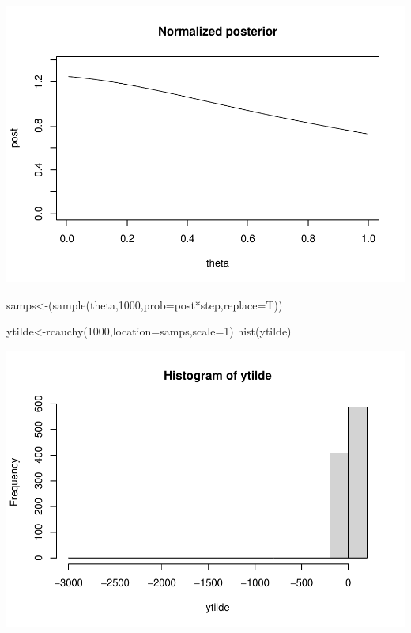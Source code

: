 \documentclass[
]{book}
\newenvironment{Shaded}{\begin{snugshade}}{\end{snugshade}}
\newcommand{\AttributeTok}[1]{\textcolor[rgb]{0.77,0.63,0.00}{#1}}
\newcommand{\DecValTok}[1]{\textcolor[rgb]{0.00,0.00,0.81}{#1}}
\newcommand{\FunctionTok}[1]{\textcolor[rgb]{0.00,0.00,0.00}{#1}}
\newcommand{\NormalTok}[1]{#1}
\newcommand{\OtherTok}[1]{\textcolor[rgb]{0.56,0.35,0.01}{#1}}
\newcommand{\SpecialCharTok}[1]{\textcolor[rgb]{0.00,0.00,0.00}{#1}}
\theoremstyle{definition}
\theoremstyle{definition}
\theoremstyle{definition}
\theoremstyle{definition}
\theoremstyle{remark}
\begin{document}
\includegraphics{_main_files/figure-latex/unnamed-chunk-53-1.pdf}

\begin{Shaded}
\begin{Highlighting}[]
\NormalTok{ samps}\OtherTok{\textless{}{-}}\NormalTok{(}\FunctionTok{sample}\NormalTok{(theta,}\DecValTok{1000}\NormalTok{,}\AttributeTok{prob=}\NormalTok{post}\SpecialCharTok{*}\NormalTok{step,}\AttributeTok{replace=}\NormalTok{T))}
  
\NormalTok{ytilde}\OtherTok{\textless{}{-}}\FunctionTok{rcauchy}\NormalTok{(}\DecValTok{1000}\NormalTok{,}\AttributeTok{location=}\NormalTok{samps,}\AttributeTok{scale=}\DecValTok{1}\NormalTok{) }
 \FunctionTok{hist}\NormalTok{(ytilde)}
\end{Highlighting}
\end{Shaded}

\includegraphics{_main_files/figure-latex/unnamed-chunk-53-2.pdf}
\end{document}
